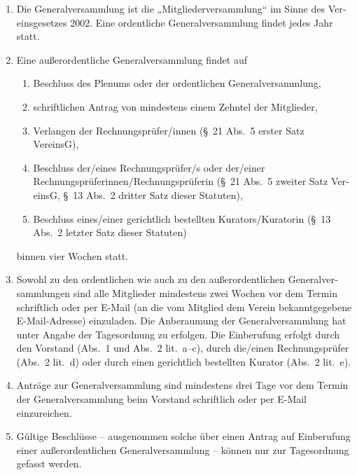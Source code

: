 \begin{otherlanguage}{german}

\begin{enumerate}[statutenenum]
    \item Die Generalversammlung ist die „Mitgliederversammlung“ im Sinne des Vereinsgesetzes 2002.
        Eine ordentliche Generalversammlung findet jedes Jahr statt.

    \item Eine außerordentliche Generalversammlung findet auf
        \begin{enumerate}[statutenenum]
            \item Beschluss des Plenums oder der ordentlichen Generalversammlung,

            \item schriftlichen Antrag von mindestens einem Zehntel der Mitglieder,

            \item Verlangen der Rechnungsprüfer/innen (\S\ 21 Abs.\ 5 erster Satz VereinsG),

            \item Beschluss der/eines Rechnungsprüfer/s oder der/einer Rechnungsprüferinnen/Rechnungsprüferin (\S\ 21 Abs.\ 5 zweiter Satz VereinsG, \S\ 13 Abs.\ 2 dritter Satz dieser Statuten),

            \item Beschluss eines/einer gerichtlich bestellten Kurators/Kuratorin (\S\ 13 Abs.\ 2 letzter Satz dieser Statuten)
        \end{enumerate}
        binnen vier Wochen statt.

    \item Sowohl zu den ordentlichen wie auch zu den außerordentlichen Generalversammlungen sind alle Mitglieder mindestens zwei Wochen vor dem Termin schriftlich oder per E-Mail (an die vom Mitglied dem Verein bekanntgegebene E-Mail-Adresse) einzuladen.
        Die Anberaumung der Generalversammlung hat unter Angabe der Tagesordnung zu erfolgen.
        Die Einberufung erfolgt durch den Vorstand (Abs.\ 1 und Abs.\ 2 lit.\ a--c), durch die/einen Rechnungsprüfer (Abs.\ 2 lit.\ d) oder durch einen gerichtlich bestellten Kurator (Abs.\ 2 lit.\ e).

    \item Anträge zur Generalversammlung sind mindestens drei Tage vor dem Termin der Generalversammlung beim Vorstand schriftlich oder per E-Mail einzureichen.

    \item Gültige Beschlüsse -- ausgenommen solche über einen Antrag auf Einberufung einer außerordentlichen Generalversammlung -- können nur zur Tagesordnung gefasst werden.


\end{enumerate}
\end{otherlanguage}
